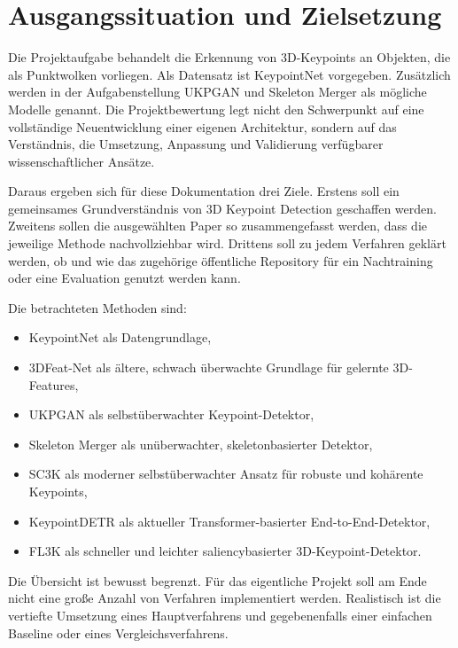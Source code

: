 \documentclass[11pt,a4paper]{article}
\begin{document}
\tableofcontents
\newpage
{}

\section{Ausgangssituation und Zielsetzung}

Die Projektaufgabe behandelt die Erkennung von 3D-Keypoints an Objekten, die als Punktwolken vorliegen. Als Datensatz ist KeypointNet vorgegeben. Zusätzlich werden in der Aufgabenstellung UKPGAN und Skeleton Merger als mögliche Modelle genannt. Die Projektbewertung legt nicht den Schwerpunkt auf eine vollständige Neuentwicklung einer eigenen Architektur, sondern auf das Verständnis, die Umsetzung, Anpassung und Validierung verfügbarer wissenschaftlicher Ansätze.

Daraus ergeben sich für diese Dokumentation drei Ziele. Erstens soll ein gemeinsames Grundverständnis von 3D Keypoint Detection geschaffen werden. Zweitens sollen die ausgewählten Paper so zusammengefasst werden, dass die jeweilige Methode nachvollziehbar wird. Drittens soll zu jedem Verfahren geklärt werden, ob und wie das zugehörige öffentliche Repository für ein Nachtraining oder eine Evaluation genutzt werden kann.

Die betrachteten Methoden sind:

\begin{itemize}
    \item KeypointNet als Datengrundlage,
    \item 3DFeat-Net als ältere, schwach überwachte Grundlage für gelernte 3D-Features,
    \item UKPGAN als selbstüberwachter Keypoint-Detektor,
    \item Skeleton Merger als unüberwachter, skeletonbasierter Detektor,
    \item SC3K als moderner selbstüberwachter Ansatz für robuste und kohärente Keypoints,
    \item KeypointDETR als aktueller Transformer-basierter End-to-End-Detektor,
    \item FL3K als schneller und leichter saliencybasierter 3D-Keypoint-Detektor.
\end{itemize}

Die Übersicht ist bewusst begrenzt. Für das eigentliche Projekt soll am Ende nicht eine große Anzahl von Verfahren implementiert werden. Realistisch ist die vertiefte Umsetzung eines Hauptverfahrens und gegebenenfalls einer einfachen Baseline oder eines Vergleichsverfahrens.
\end{document}
